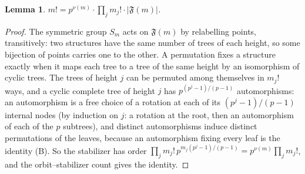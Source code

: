 \documentclass[11pt]{article}
\newtheorem{lemma}{Lemma}
\theoremstyle{remark}
\newcommand{\F}{\mathfrak F}
\begin{document}
\begin{lemma}\label{L3}
$m!=p^{\nu(m)}\cdot\prod_jm_j!\cdot|\F(m)|$.
\end{lemma}
\begin{proof}
The symmetric group $S_m$ acts on $\F(m)$ by relabelling points, transitively: two structures
have the same number of trees of each height, so some bijection of points carries one to the
other. A permutation fixes a structure exactly when it maps each tree to a tree of the same
height by an isomorphism of cyclic trees. The trees of height $j$ can be permuted among
themselves in $m_j!$ ways, and a cyclic complete tree of height $j$ has
$p^{(p^j-1)/(p-1)}$ automorphisms: an automorphism is a free choice of a rotation at each of
its $(p^j-1)/(p-1)$ internal nodes (by induction on $j$: a rotation at the root, then an
automorphism of each of the $p$ subtrees), and distinct automorphisms induce distinct
permutations of the leaves, because an automorphism fixing every leaf is the identity (B).
So the stabilizer has order
$\prod_j m_j!\,p^{m_j(p^j-1)/(p-1)}=p^{\nu(m)}\prod_jm_j!$, and the orbit--stabilizer count
gives the identity.
\end{proof}
\end{document}

